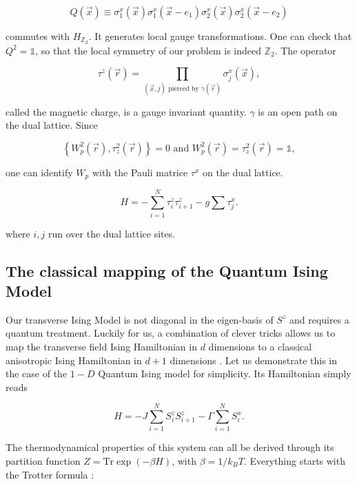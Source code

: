 \documentclass[11pt,openany]{article}
\begin{document}
\begin{equation}
	Q(\vec{x}) \equiv \sigma_1^x(\vec{x})\sigma_1^x(\vec{x}-e_1)\sigma_2^x(\vec{x})\sigma_2^x(\vec{x}-e_2)
\end{equation}

commutes with $H_{\mathds{Z}_2}$. It generates local gauge transformations. One can check that $Q^2=\mathds{1}$, so that the local symmetry of our problem is indeed $\mathds{Z}_2$. The operator

\begin{equation}
	\tau^z(\vec{r}) = \prod_{(\vec{x},j) \text{ pierced by } \gamma(\vec{r})}\sigma_j^x(\vec{x}),
\end{equation}

called the magnetic charge, is a gauge invariant quantity. $\gamma$ is an open path on the dual lattice. Since

\begin{equation}
	\left\{W_p^2(\vec{r}),\tau_z^2(\vec{r})\right\} = 0\text{ and }W_p^2(\vec{r}) = \tau_z^2(\vec{r}) = \mathds{1},
\end{equation} 

one can identify $W_p$ with the Pauli matrice $\tau^x$ on  the dual lattice.

\begin{equation}
	H = -\sum_{i=1}^N\tau^z_i\tau^z_{i+1} - g\sum\tau^x_j.
\end{equation}

where $i,j$ run over the dual lattice sites.


\subsection{The classical mapping of the Quantum Ising Model}

Our transverse Ising Model is not diagonal in the eigen-basis of $S^z$ and requires a quantum treatment. Luckily for us, a combination of clever tricks allows us to map the transverse field Ising Hamiltonian in $d$ dimensions to a classical anisotropic Ising Hamiltonian in $d+1$ dimensions \cite{Chakrabarti}. Let us demonstrate this in the case of the $1-D$ Quantum Ising model for simplicity. Its Hamiltonian simply reads

\begin{equation}
	H = -J\sum_{i=1}^N S_i^zS_{i+1}^z - \Gamma\sum_{i=1}^N S_i^x.
\end{equation}

The thermodynamical properties of this system can all be derived through its partition function $Z = \mathrm{Tr}\exp(-\beta H)$, with $\beta=1/k_BT$. Everything starts with the Trotter formula \cite{trotter}:
\end{document}
